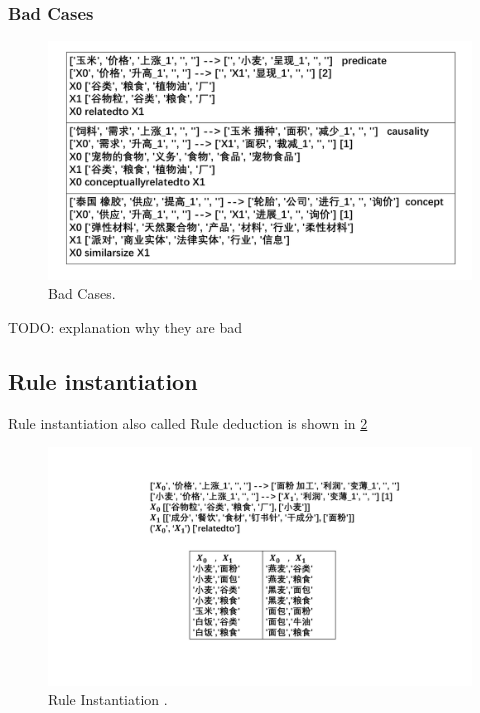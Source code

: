 \subsubsection{Bad Cases}
\begin{figure}[htbp]
	\centerline{\includegraphics[width=0.9\columnwidth]{figures/bad_rule_case}}
	\caption{Bad Cases.}
	\label{fig:bad_rule_case}

\end{figure}
	TODO: explanation why they are bad
	




\subsection{Rule instantiation}
Rule instantiation also called Rule deduction is shown in \ref{fig:instantiation}
\begin{figure}[htbp]
	\centerline{\includegraphics[width=0.9\columnwidth]{figures/instantiation}}
	\caption{Rule Instantiation .}
	\label{fig:instantiation}
\end{figure}







